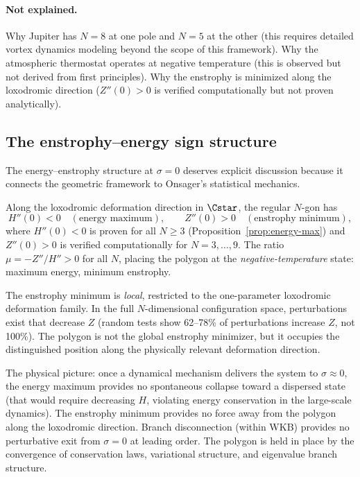 \paragraph{Not explained.}
Why Jupiter has $N = 8$ at one pole and $N = 5$ at the other (this
requires detailed vortex dynamics modeling beyond the scope of this
framework).  Why the atmospheric thermostat operates at negative
temperature (this is observed but not derived from first principles).
Why the enstrophy is minimized along the loxodromic direction
($Z''(0) > 0$ is verified computationally but not proven analytically).

\subsection{The enstrophy--energy sign structure}
\label{sec:enstrophy-discussion}

The energy--enstrophy structure at $\sigma = 0$ deserves explicit
discussion because it connects the geometric framework to Onsager's
statistical mechanics.

Along the loxodromic deformation direction in $\Cstar$, the regular
$N$-gon has
\begin{equation}\label{eq:sign-structure}
  H''(0) < 0 \quad (\text{energy maximum}), \qquad
  Z''(0) > 0 \quad (\text{enstrophy minimum}),
\end{equation}
where $H''(0) < 0$ is proven for all $N \ge 3$
(Proposition~\ref{prop:energy-max}) and $Z''(0) > 0$ is verified
computationally for $N = 3, \ldots, 9$.  The ratio $\mu = -Z''/H'' > 0$
for all $N$, placing the polygon at the \emph{negative-temperature}
state: maximum energy, minimum enstrophy.

The enstrophy minimum is \emph{local}, restricted to the one-parameter
loxodromic deformation family.  In the full $N$-dimensional
configuration space, perturbations exist that decrease $Z$ (random tests
show 62--78\% of perturbations increase $Z$, not 100\%).  The polygon is
not the global enstrophy minimizer, but it occupies the distinguished
position along the physically relevant deformation direction.

The physical picture: once a dynamical mechanism delivers the system to
$\sigma \approx 0$, the energy maximum provides no spontaneous collapse
toward a dispersed state (that would require decreasing $H$, violating
energy conservation in the large-scale dynamics).  The enstrophy minimum
provides no force away from the polygon along the loxodromic direction.
Branch disconnection (within WKB) provides no perturbative exit from
$\sigma = 0$ at leading order.  The polygon is held in place by the
convergence of conservation laws, variational structure, and eigenvalue
branch structure.

